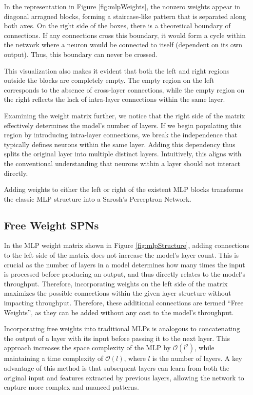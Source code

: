 In the representation in Figure \ref{fig:mlpWeights}, the nonzero weights appear in diagonal arragned blocks, forming a staircase-like pattern that is separated along both axes. On the right side of the boxes, there is a theoretical boundary of connections. If any connections cross this boundary, it would form a cycle within the network where a neuron would be connected to itself (dependent on its own output). Thus, this boundary can never be crossed.

This visualization also makes it evident that both the left and right regions outside the blocks are completely empty. The empty region on the left corresponds to the absence of cross-layer connections, while the empty region on the right reflects the lack of intra-layer connections within the same layer.

Examining the weight matrix further, we notice that the right side of the matrix effectively determines the model’s number of layers. If we begin populating this region by introducing intra-layer connections, we break the independence that typically defines neurons within the same layer. Adding this dependency thus splits the original layer into multiple distinct layers. Intuitively, this aligns with the conventional understanding that neurons within a layer should not interact directly.

Adding weights to either the left or right of the existent MLP blocks transforms the classic MLP structure into a Sarosh’s Perceptron Network.

\subsection{Free Weight SPNs}

In the MLP weight matrix shown in Figure \ref{fig:mlpStructure}, adding connections to the left side of the matrix does not increase the model's layer count. This is crucial as the number of layers in a model determines how many times the input is processed before producing an output, and thus directly relates to the model’s throughput. Therefore, incorporating weights on the left side of the matrix maximizes the possible connections within the given layer structure without impacting throughput. Therefore, these additional connections are termed “Free Weights”, as they can be added without any cost to the model's throughput. 

Incorporating free weights into traditional MLPs is analogous to concatenating the output of a layer with its input before passing it to the next layer. This approach increases the space complexity of the MLP by $\mathcal{O}(l^2)$, while maintaining a time complexity of $\mathcal{O}(l)$, where $l$ is the number of layers. A key advantage of this method is that subsequent layers can learn from both the original input and features extracted by previous layers, allowing the network to capture more complex and nuanced patterns.

